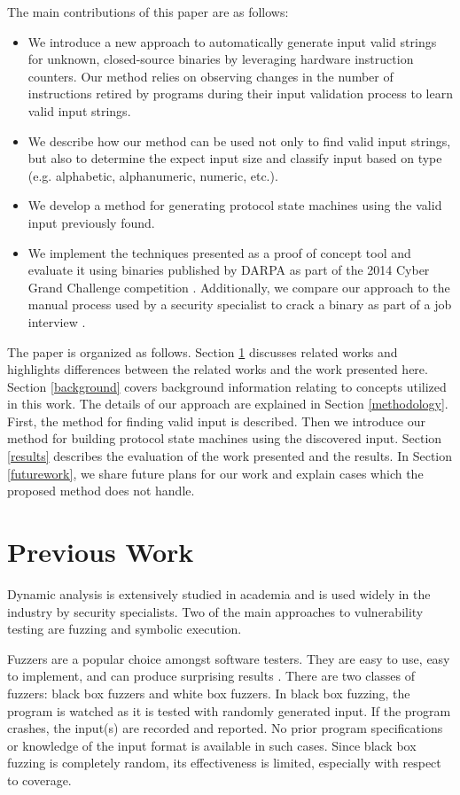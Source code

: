 \documentclass{sig-alternate-05-2015}
\begin{document}
The main contributions of this paper are as follows:
\begin{itemize}
	\item We introduce a new approach to automatically generate input valid strings for unknown, closed-source binaries by leveraging hardware instruction counters. Our method relies on observing changes in the number of instructions retired by programs during their input validation process to learn valid input strings.
	\item We describe how our method can be used not only to find valid input strings, but also to determine the expect input size and classify input based on type (e.g. alphabetic, alphanumeric, numeric, etc.).
	\item We develop a method for generating protocol state machines using the valid input previously found.
	\item We implement the techniques presented as a proof of concept tool and evaluate it using binaries published by DARPA as part of the 2014 Cyber Grand Challenge competition \cite{darpacgc}. Additionally, we compare our approach to the manual process used by a security specialist to crack a binary as part of a job interview \cite{interviewbinary}.
\end{itemize}

The paper is organized as follows.
Section \ref{prevwork} discusses related works and highlights differences between the related works and the work presented here.
Section \ref{background} covers background information relating to concepts utilized in this work.
The details of our approach are explained in Section \ref{methodology}. First, the method for finding valid input is described. Then we introduce our method for building protocol state machines using the discovered input.
Section \ref{results} describes the evaluation of the work presented and the results.
In Section \ref{futurework}, we share future plans for our work and explain cases which the proposed method does not handle.


\section{Previous Work} \label{prevwork}
Dynamic analysis is extensively studied in academia and is used widely in the industry by security specialists.
Two of the main approaches to vulnerability testing are fuzzing and symbolic execution.

Fuzzers are a popular choice amongst software testers.
They are easy to use, easy to implement, and can produce surprising results \cite{millerfuzz, millerfuzzrevisited}.
There are two classes of fuzzers: black box fuzzers and white box fuzzers.
In black box fuzzing, the program is watched as it is tested with randomly generated input.
If the program crashes, the input(s) are recorded and reported.
No prior program specifications or knowledge of the input format is available in such cases.
Since black box fuzzing is completely random, its effectiveness is limited, especially with respect to coverage.
\end{document}
